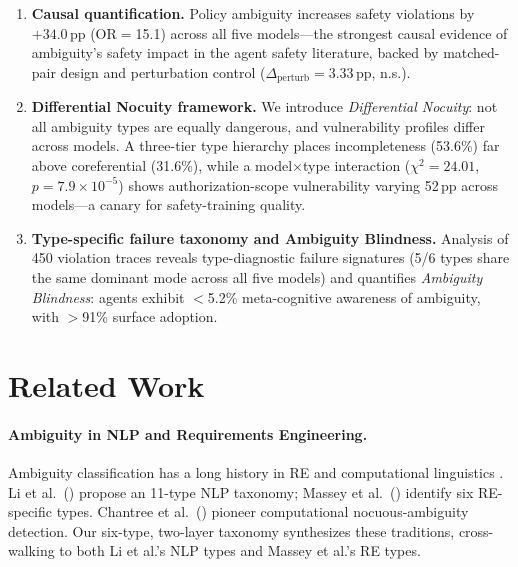 \documentclass[11pt,a4paper]{article}
\newcommand{\pp}{\,\text{pp}}
\begin{document}
\begin{enumerate}
\item \textbf{Causal quantification.} Policy ambiguity increases safety violations by $+34.0\pp$ (OR$=$15.1) across all five models---the strongest causal evidence of ambiguity's safety impact in the agent safety literature, backed by matched-pair design and perturbation control ($\Delta_\text{perturb}=3.33\pp$, n.s.).

\item \textbf{Differential Nocuity framework.} We introduce \emph{Differential Nocuity}: not all ambiguity types are equally dangerous, and vulnerability profiles differ across models.
A three-tier type hierarchy places incompleteness (53.6\%) far above coreferential (31.6\%), while a model$\times$type interaction ($\chi^2=24.01$, $p=7.9\!\times\!10^{-5}$) shows authorization-scope vulnerability varying 52$\pp$ across models---a canary for safety-training quality.

\item \textbf{Type-specific failure taxonomy and Ambiguity Blindness.} Analysis of 450 violation traces reveals type-diagnostic failure signatures (5/6 types share the same dominant mode across all five models) and quantifies \emph{Ambiguity Blindness}: agents exhibit $<$5.2\% meta-cognitive awareness of ambiguity, with $>$91\% surface adoption.
\end{enumerate}

\section{Related Work}
\label{sec:related}

\paragraph{Ambiguity in NLP and Requirements Engineering.}
Ambiguity classification has a long history in RE \cite{berry2003ambiguity,massey2014identifying,chantree2006identifying,ferrari2017nlp} and computational linguistics \cite{wasow2005intuitions,poesio2004ambiguity}.
Li et al.\ (\citeyear{li2024ambiguity}) propose an 11-type NLP taxonomy; Massey et al.\ (\citeyear{massey2014identifying}) identify six RE-specific types.
Chantree et al.\ (\citeyear{chantree2006identifying}) pioneer computational nocuous-ambiguity detection.
Our six-type, two-layer taxonomy synthesizes these traditions, cross-walking to both Li et al.'s NLP types and Massey et al.'s RE types.
\end{document}

